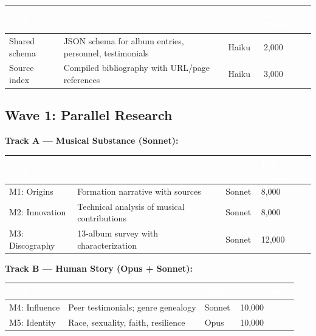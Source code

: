 \documentclass[11pt,letterpaper]{article}
\newcommand{\tableheader}[1]{\textbf{\sffamily\textcolor{white}{#1}}}
\begin{document}
\begin{center}
\begin{tabularx}{\textwidth}{L{3cm}XC{1.5cm}C{2cm}}
\toprule
{}
\tableheader{Task} & \tableheader{Output} & \tableheader{Model} & \tableheader{Est. Tokens} \\
\midrule
Shared schema & JSON schema for album entries, personnel, testimonials & Haiku & 2,000 \\
Source index & Compiled bibliography with URL/page references & Haiku & 3,000 \\
\bottomrule
\end{tabularx}
\end{center}

\subsection{Wave 1: Parallel Research}

\textbf{Track A --- Musical Substance (Sonnet):}

\begin{center}
\begin{tabularx}{\textwidth}{L{2.5cm}XC{1.5cm}C{2cm}}
\toprule
{}
\tableheader{Task} & \tableheader{Output} & \tableheader{Model} & \tableheader{Est. Tokens} \\
\midrule
M1: Origins & Formation narrative with sources & Sonnet & 8,000 \\
M2: Innovation & Technical analysis of musical contributions & Sonnet & 8,000 \\
M3: Discography & 13-album survey with characterization & Sonnet & 12,000 \\
\bottomrule
\end{tabularx}
\end{center}

\textbf{Track B --- Human Story (Opus + Sonnet):}

\begin{center}
\begin{tabularx}{\textwidth}{L{2.5cm}XC{1.5cm}C{2cm}}
\toprule
{}
\tableheader{Task} & \tableheader{Output} & \tableheader{Model} & \tableheader{Est. Tokens} \\
\midrule
M4: Influence & Peer testimonials; genre genealogy & Sonnet & 10,000 \\
M5: Identity & Race, sexuality, faith, resilience & Opus & 10,000 \\
\bottomrule
\end{tabularx}
\end{center}
\end{document}
